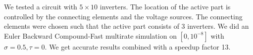 \documentclass{report}
\begin{document}
We tested a circuit with $5 \times 10$ inverters.
The location of the active part is controlled by the connecting
elements and the voltage sources. The connecting elements were chosen
such that the active part consists of 3 inverters.
We did an Euler Backward Compound-Fast multirate simulation on
$[0,10^{-8}]$ with $\sigma = 0.5,\tau = 0$.
We get accurate results combined with a speedup factor 13.
\end{document}
